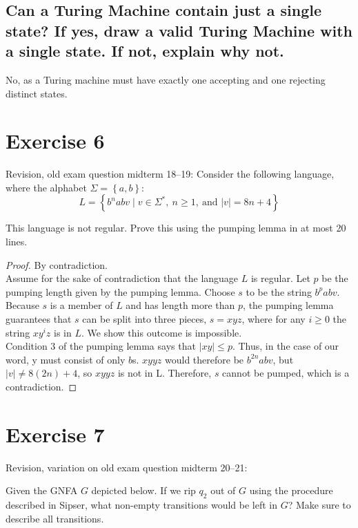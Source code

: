 \documentclass[a4paper,11pt]{article}
\newcommand{\Alphabet}{\Sigma}
\newcommand{\set}[1]{\left\{ #1 \right\}}
\begin{document}
	\vspace{1cm}

	\subsection{Can a Turing Machine contain just a single state? If yes, draw a valid Turing Machine with a single state. If not, explain why not.}
	No, as a Turing machine must have exactly one accepting and one rejecting distinct states.

	\vspace{1cm}

	\section{Exercise 6}
	Revision, old exam question midterm 18--19: Consider the following language, where the alphabet $\Alphabet = \set{a,b}$:
	\[
	L = \set{b^n a b v \mid v \in \Alphabet^*,\ n \geq 1,\ \text{and } |v| = 8n + 4}
	\]

	This language is not regular. Prove this using the pumping lemma in at most 20 lines.

	\begin{proof}
		By contradiction.\\
		Assume for the sake of contradiction that the language $L$ is regular. Let $p$ be the pumping length given by the pumping lemma. Choose $s$ to be the string $b^pabv$. Because $s$ is a member of $L$ and has length more than $p$, the pumping lemma guarantees that $s$ can be split into three pieces, $s = xyz$, where for any $i \ge 0$ the string $xy^iz$ is in $L$. We show this outcome is impossible.\\
		Condition 3 of the pumping lemma says that $|xy| \le p$. Thus, in the case of our word, y must consist of only $b$s. $xyyz$ would therefore be $b^{2n}abv$, but $|v|\neq 8(2n) + 4$, so $xyyz$ is not in L. Therefore, $s$ cannot be pumped, which is a contradiction.
	\end{proof}

	\section{Exercise 7}
	Revision, variation on old exam question midterm 20--21:

	Given the GNFA $G$ depicted below. If we rip $q_2$ out of $G$ using the procedure described in Sipser, what non-empty transitions would be left in $G$? Make sure to describe all transitions.
\end{document}
